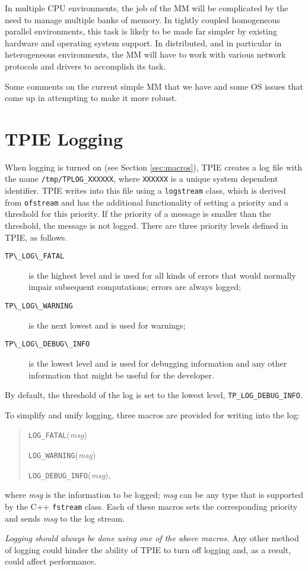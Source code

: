 In multiple CPU environments, the job of the MM will be complicated by
the need to manage multiple banks of memory.  In tightly coupled
homogeneous parallel environments, this task is likely to be made far
simpler by existing hardware and operating system support.  In
distributed, and in particular in heterogeneous environments, the MM
will have to work with various network protocols and drivers to
accomplish its task.

Some comments on the current simple MM that we have and some OS issues
that come up in attempting to make it more robust.

\section{TPIE Logging}
\label{sec:logging}

When logging is turned on (see Section \ref{sec:macros}), TPIE creates a log file with the name \verb|/tmp/TPLOG_XXXXXX|, where \verb|XXXXXX| is a unique system dependent identifier. TPIE writes into this file using a \verb|logstream| class, which is derived from \verb|ofstream| and has the additional functionality of setting a priority and a threshold for this priority. If the priority of a message is smaller than the threshold, the message is not logged. There are three priority levels defined in TPIE, as follows.
\begin{description}
\item[\verb|TP\_LOG\_FATAL|] is the highest level and is used for all kinds of errors that would normally impair subsequent computations; errors are always logged;
\item[\verb|TP\_LOG\_WARNING|] is the next lowest and is used for warnings;
\item[\verb|TP\_LOG\_DEBUG\_INFO|] is the lowest level and is used for debugging information and any other information that might be useful for the developer.
\end{description}
By default, the threshold of the log is set to the lowest level, \verb|TP_LOG_DEBUG_INFO|.

To simplify and unify logging, three macros are provided for writing into the log: 
\begin{quote}
\verb|LOG_FATAL|({\em msg})

\verb|LOG_WARNING|({\em msg})

\verb|LOG_DEBUG_INFO|({\em msg}),
\end{quote}
where {\em msg} is the information to be logged; {\em msg} can be any type that is supported by the C++ \verb|fstream| class. Each of these macros sets the corresponding priority and sends {\em msg} to the log stream.

{\em Logging should always be done using one of the above macros.} Any other method of logging could hinder the ability of TPIE to turn off logging and, as a result, could affect performance.

